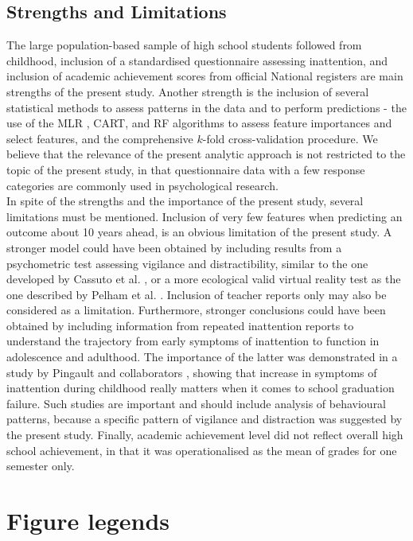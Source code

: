 \documentclass[10pt,letterpaper]{article}
\begin{document}
{ \subsection*{Strengths and Limitations}
The large population-based sample of high school students followed from childhood, inclusion of a standardised questionnaire assessing inattention, and inclusion of academic achievement scores from official National registers are main strengths of the present study. Another strength is the inclusion of several statistical methods to 
assess patterns in the data and to perform predictions  - the use of the MLR , CART, and RF algorithms to assess feature importances and select features, 
and the comprehensive $k$-fold cross-validation procedure. We believe that the relevance of the present analytic approach is not restricted 
to the topic of the present study, in that questionnaire data with a few response categories are commonly used in psychological research. \\


In spite of the strengths and the importance of the present study, several limitations must be mentioned. Inclusion of very few features when predicting an outcome about 10 years ahead, is an obvious limitation of the present study. A stronger model could have been obtained by including results from a psychometric test assessing vigilance and distractibility, similar to the one developed by Cassuto et al. \cite{Cassuto2013}, or a more ecological valid virtual reality test as the one described by Pelham et al. \cite{Pelham2011}. Inclusion of teacher reports only may also be considered as a limitation.  Furthermore, stronger conclusions could have been obtained by including information from repeated inattention reports to understand the trajectory from early symptoms of inattention to function in adolescence and adulthood. The importance of the latter was demonstrated in a study by Pingault and collaborators \cite{Pingault2014}, showing that increase in symptoms of inattention during childhood really matters when it comes to school graduation failure. Such studies are important and should include analysis of behavioural patterns, because a specific pattern of vigilance and distraction was suggested by the present study. Finally, academic achievement level did not reflect overall high school achievement, in that it was operationalised as the mean of grades for one semester only.\\


\vspace{3mm}
\section*{Figure legends}
}
\end{document}
